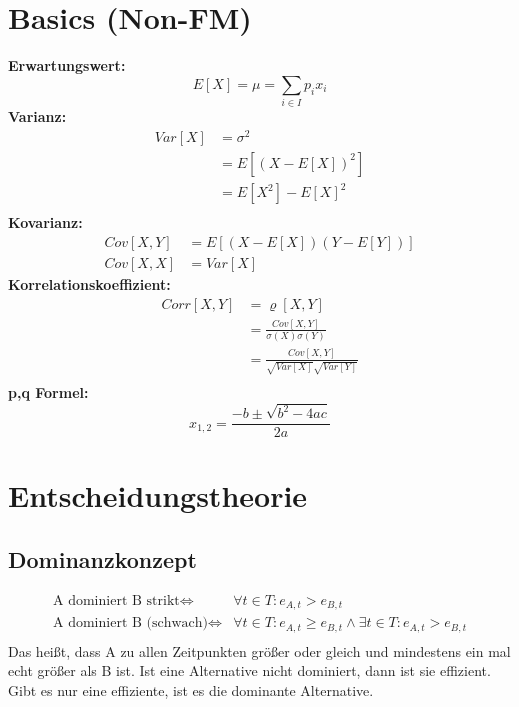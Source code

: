 \documentclass[leqno]{scrartcl}
\begin{document}
\begin{multicols}{3}

\section{Basics (Non-FM)}

\textbf{Erwartungswert:}
  \begin{equation}
    E[X]=\mu=\sum_{i \in I} p_i x_i
  \end{equation}
\textbf{Varianz:}
  \begin{equation*}
    \begin{split}
      Var[X]&=\sigma^2\\
          &=E[(X-E[X])^2]\\
          &=E[X^2]-E[X]^2\\
    \end{split}
  \end{equation*}
\textbf{Kovarianz:}
  \begin{equation}
    \begin{split}
    Cov[X,Y]&=E[(X-E[X])(Y-E[Y])]\\
    Cov[X,X]&=Var[X]
    \end{split}
  \end{equation}
\textbf{Korrelationskoeffizient:}
  \begin{equation*}
    \begin{split}
      Corr[X,Y] &= \varrho [X,Y]\\
                &= \frac{Cov[X,Y]}{\sigma (X) \sigma (Y)}\\
                &= \frac{Cov[X,Y]}{\sqrt{Var[X]}\sqrt{Var[Y]}}\\
    \end{split}
  \end{equation*}
\textbf{p,q Formel:}
  \begin{equation}
    x_{1,2}=\frac{-b \pm \sqrt{b^2 - 4ac}}{2a}
  \end{equation}

\section{Entscheidungstheorie}

\subsection{Dominanzkonzept}

\begin{equation*}
\begin{split}
        \text{A dominiert B strikt} \Leftrightarrow & \forall t \in T : e_{A,t} > e_{B,t}\\
        \text{A dominiert B (schwach)} \Leftrightarrow & \forall t \in T : e_{A,t} \geq e_{B,t} \wedge \exists t \in T : e_{A,t} > e_{B,t}\\
\end{split}
\end{equation*}
Das heißt, dass A zu allen Zeitpunkten größer oder gleich und mindestens ein mal 
echt größer als B ist. Ist eine Alternative nicht dominiert, dann ist sie 
effizient. Gibt es nur eine effiziente, ist es die dominante Alternative.


\end{multicols}
\end{document}
